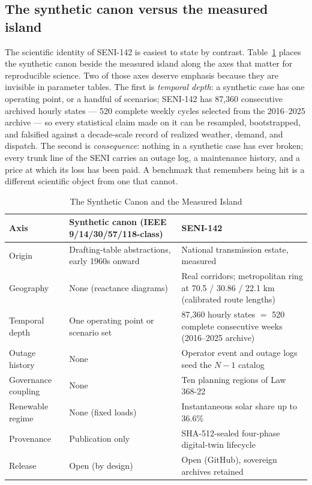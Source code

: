 \subsection{The synthetic canon versus the measured island}
\label{sub:canon}

The scientific identity of SENI-142 is easiest to state by contrast. Table~\ref{tab:canon} places the synthetic canon beside the measured island along the axes that matter for reproducible science. Two of those axes deserve emphasis because they are invisible in parameter tables. The first is \emph{temporal depth}: a synthetic case has one operating point, or a handful of scenarios; SENI-142 has 87,360 consecutive archived hourly states --- 520 complete weekly cycles selected from the 2016--2025 archive --- so every statistical claim made on it can be resampled, bootstrapped, and falsified against a decade-scale record of realized weather, demand, and dispatch. The second is \emph{consequence}: nothing in a synthetic case has ever broken; every trunk line of the SENI carries an outage log, a maintenance history, and a price at which its loss has been paid. A benchmark that remembers being hit is a different scientific object from one that cannot.

\begin{table}[!t]
\caption{The Synthetic Canon and the Measured Island}
\label{tab:canon}
\centering
\footnotesize
\begin{tabular}{@{}l p{} p{}@{}}
\toprule
\textbf{Axis} & \textbf{Synthetic canon (IEEE 9/14/30/57/118-class)} & \textbf{SENI-142} \\
\midrule
Origin & Drafting-table abstractions, early 1960s onward & National transmission estate, measured \\
Geography & None (reactance diagrams) & Real corridors; metropolitan ring at 70.5 / 30.86 / 22.1 km (calibrated route lengths) \\
Temporal depth & One operating point or scenario set & 87,360 hourly states $=$ 520 complete consecutive weeks (2016--2025 archive) \\
Outage history & None & Operator event and outage logs seed the $N-1$ catalog \\
Governance coupling & None & Ten planning regions of Law 368-22 \\
Renewable regime & None (fixed loads) & Instantaneous solar share up to 36.6\% \\
Provenance & Publication only & SHA-512-sealed four-phase digital-twin lifecycle \\
Release & Open (by design) & Open (GitHub), sovereign archives retained \\
\bottomrule
\end{tabular}
\end{table}
